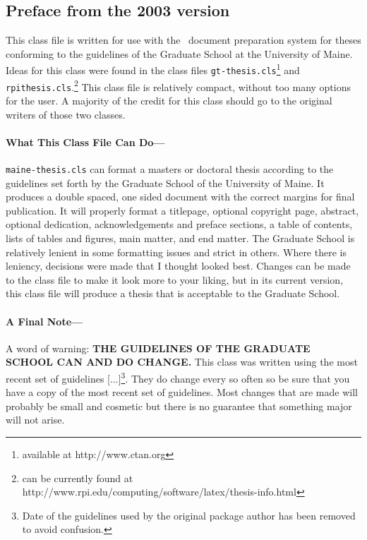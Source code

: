 \begin{preface}
\section{Preface from the 2003 version}

 This class file is written for use with the \LaTeXe\ document preparation system for theses
 conforming to the guidelines of the Graduate School at the University of Maine.
 Ideas for this class were found in
 the class files \verb=gt-thesis.cls=\footnote{available at
 http://www.ctan.org} and \verb=rpithesis.cls=.\footnote{can be currently found at
  http://www.rpi.edu/computing/software/latex/thesis-info.html}  This class
 file is relatively compact, without too many options for the user.  A majority of the
 credit for this class should go to the original writers of those two classes.

 \paragraph{What This Class File Can Do---}
 \verb=maine-thesis.cls= can format a masters or doctoral thesis according to the guidelines set
 forth by the Graduate School of the University of Maine.  It produces a double spaced, one sided
 document with the correct margins for final publication.
 It will properly format a titlepage,
 optional copyright page, abstract, optional dedication, acknowledgements and preface sections,
 a table of contents, lists of tables and figures, main matter, and end matter.  The Graduate
 School is relatively lenient in some formatting issues and strict in others.  Where there is
 leniency, decisions were made that I thought looked best.  Changes can be made to the class file
 to make it look more to your liking, but in its current version, this class file
 will produce a thesis that is acceptable to the Graduate School.
 \paragraph{A Final Note---}
 A word of warning:  {\bfseries THE GUIDELINES OF THE GRADUATE SCHOOL CAN AND DO CHANGE.}
 This class was written using the most recent set of guidelines [...]\footnote{Date of the guidelines used by the original package author has been removed to avoid confusion.}.
 They do change every so often so be sure that you have a copy of the most recent set of
 guidelines.  Most changes that are made will probably be small and cosmetic but there is no guarantee that
 something major will not arise.


\end{preface}
